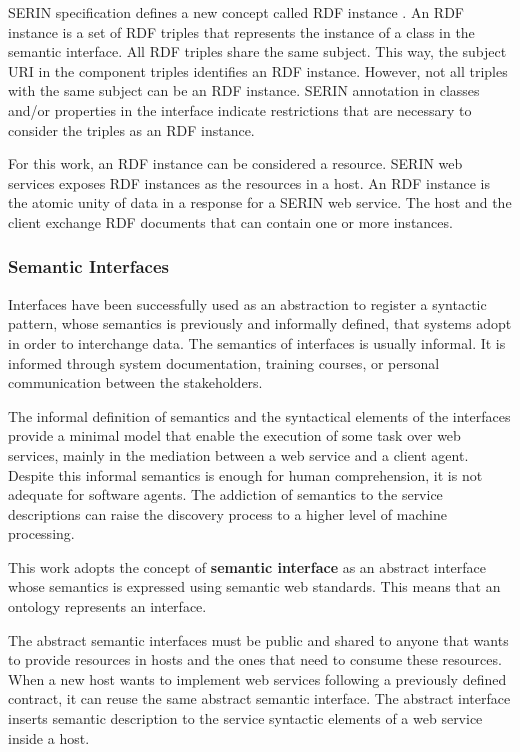 \documentclass{singlecol-new}
\theoremstyle{TH}{
\newtheorem{lemma}{Lemma}
\newtheorem{theorem}[lemma]{Theorem}
\newtheorem{corrolary}[lemma]{Corrolary}
\newtheorem{conjecture}[lemma]{Conjecture}
\newtheorem{proposition}[lemma]{Proposition}
\newtheorem{claim}[lemma]{Claim}
\newtheorem{stheorem}[lemma]{Wrong Theorem}
\newtheorem{algorithm}{Algorithm}
}
\theoremstyle{THrm}{
\newtheorem{definition}{Definition}[section]
\newtheorem{question}{Question}[section]
\newtheorem{remark}{Remark}
\newtheorem{scheme}{Scheme}
}
\theoremstyle{THhit}{
\newtheorem{case}{Case}[section]
}
\begin{document}
SERIN specification defines a new concept called RDF instance \citep{Lira2014a}. 
An RDF instance is a set of RDF triples that represents the instance of a class in the semantic interface. 
All RDF triples share the same subject. 
This way, the subject URI in the component triples identifies an RDF instance. 
However, not all triples with the same subject can be an RDF instance.
SERIN annotation in classes and/or properties in the interface indicate restrictions that are necessary to consider the triples as an RDF instance.

For this work, an RDF instance can be considered a resource.
SERIN web services exposes RDF instances as the resources in a host. An RDF instance is the atomic unity of data in a response for a SERIN web service. 
The host and the client exchange RDF documents that can contain one or more instances. 

\subsubsection{Semantic Interfaces}
\label{sec:semanticinterface}
Interfaces have been successfully used as an abstraction to register a syntactic pattern, whose semantics is previously and informally defined, that systems adopt in order to interchange data. 
The semantics of interfaces is usually informal. It is informed through system documentation, training courses, or personal communication between the stakeholders.

%

The informal definition of semantics and the syntactical elements of the interfaces provide a minimal model  that enable the execution of some task over web services, mainly in the mediation between a web service and a client agent. 
Despite this informal semantics is enough for human comprehension, it is not adequate for software agents. The addiction of semantics to the service descriptions can raise the discovery process to a higher level of machine processing.

This work adopts the concept of \textbf{semantic interface} as an abstract interface whose semantics is expressed using semantic web standards. 
This means that an ontology represents an interface.

The abstract semantic interfaces must be public and shared to anyone that wants to provide resources in hosts and the ones that need to consume these resources.
When a new host wants to implement web services following a previously defined contract, it can reuse the same abstract semantic interface.
The abstract interface inserts semantic description to the service syntactic elements of a web service inside a host. 
\end{document}
